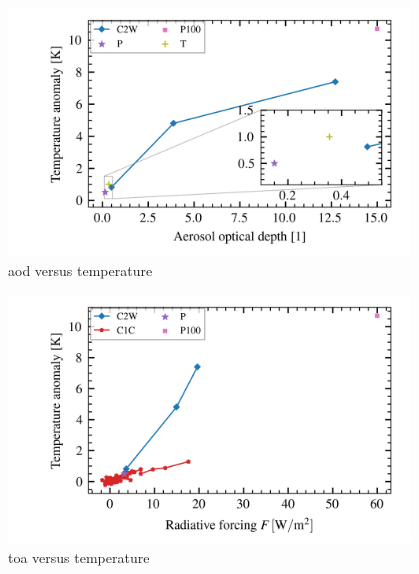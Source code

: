 \documentclass{ametsocV5}
\begin{document}
\begin{figure}
  \begin{center}
    \includegraphics[width=0.95\textwidth]{figures/aod_vs_temperature.png}
  \end{center}
  \caption{\acrshort{aod} versus temperature}
  \label{fig:aod_vs_temp}
\end{figure}

\begin{figure}
  \begin{center}
    \includegraphics[width=0.95\textwidth]{figures/toa_vs_temperature.png}
  \end{center}
  \caption{\acrshort{toa} versus temperature}
  \label{fig:toa_vs_temp}
\end{figure}

\clearpage

\end{document}
